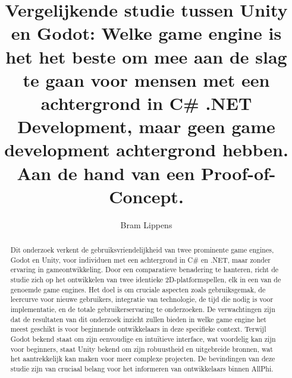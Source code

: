 \documentclass{hogent-article}
\title{Vergelijkende studie tussen Unity en Godot: Welke game engine is het het beste om mee aan de slag te gaan voor mensen met een achtergrond in C\# .NET Development, maar geen game development achtergrond hebben. Aan de hand van een Proof-of-Concept.}
\author{Bram Lippens}
\begin{document}
\begin{abstract}
Dit onderzoek verkent de gebruiksvriendelijkheid van twee prominente game engines, Godot en Unity, voor individuen met een achtergrond in C\# en .NET, maar zonder ervaring in gameontwikkeling. Door een comparatieve benadering te hanteren, richt de studie zich op het ontwikkelen van twee identieke 2D-platformspellen, elk in een van de genoemde game engines. Het doel is om cruciale aspecten zoals gebruiksgemak, de leercurve voor nieuwe gebruikers, integratie van technologie, de tijd die nodig is voor implementatie, en de totale gebruikerservaring te onderzoeken. De verwachtingen zijn dat de resultaten van dit onderzoek inzicht zullen bieden in welke game engine het meest geschikt is voor beginnende ontwikkelaars in deze specifieke context. Terwijl Godot bekend staat om zijn eenvoudige en intuïtieve interface, wat voordelig kan zijn voor beginners, staat Unity bekend om zijn robuustheid en uitgebreide bronnen, wat het aantrekkelijk kan maken voor meer complexe projecten. De bevindingen van deze studie zijn van cruciaal belang voor het informeren van ontwikkelaars binnen AllPhi.
\end{abstract}

\tableofcontents



\printbibliography[heading=bibintoc]
\end{document}
